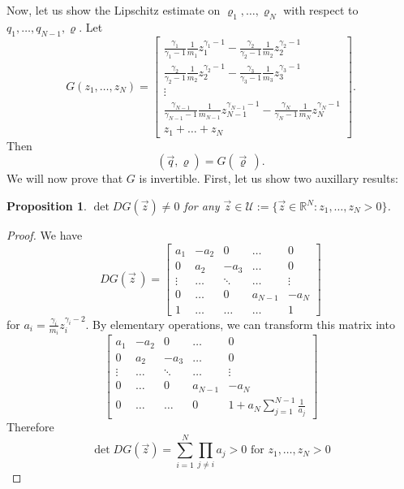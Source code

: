 \documentclass[11pt]{article}
\newtheorem{prop}[tw]{Proposition}
\numberwithin{equation}{section}
\numberwithin{tw}{section}
\begin{document}
Now, let us show the Lipschitz estimate on $\varrho_1,\dots,\varrho_N$ with respect to $q_1,\dots,q_{N-1},\varrho$. Let 
\[ G(z_1,\dots,z_N) = \left[\begin{gathered}
\frac{\gamma_1}{\gamma_1-1}\frac{1}{m_1}z_1^{\gamma_1-1} - \frac{\gamma_2}{\gamma_2-1}\frac{1}{m_2}z_2^{\gamma_2-1} \\
\frac{\gamma_2}{\gamma_2-1}\frac{1}{m_2}z_2^{\gamma_2-1} - \frac{\gamma_3}{\gamma_3-1}\frac{1}{m_3}z_3^{\gamma_3-1} \\
\vdots \\
\frac{\gamma_{N-1}}{\gamma_{N-1}-1}\frac{1}{m_{N-1}}z_{N-1}^{\gamma_{N-1}-1} - \frac{\gamma_N}{\gamma_N-1}\frac{1}{m_N}z_N^{\gamma_N-1} \\
z_1 + \dots + z_N
\end{gathered}\right]. \]
Then
\[ (\vec q, \varrho) = G(\vec\varrho\,). \]
We will now prove that $G$ is invertible. First, let us show two auxillary results:

\begin{prop}\label{det}
    $\det DG(\vec z)\neq 0$ for any $\vec z \in \mathcal{U} :=\{\vec z\in\mathbb{R}^N: z_1,\dots,z_N > 0\}$.
\end{prop}
\begin{proof}
    We have
    \[ DG(\vec z\,) = \begin{bmatrix}
        a_1 & -a_2 & 0 & \dots & 0 \\
        0 & a_2 & -a_3 & \dots & 0 \\
        \vdots & \dots & \ddots & \dots & \vdots \\
        0 & \dots & 0 & a_{N-1} & -a_N \\
        1 & \dots & \dots & \dots & 1
    \end{bmatrix}\]
    for $a_i = \frac{\gamma_i}{m_i}z_i^{\gamma_i-2}$. By elementary operations, we can transform this matrix into
    \[\begin{bmatrix}
        a_1 & -a_2 & 0 & \dots & 0 \\
        0 & a_2 & -a_3 & \dots & 0 \\
        \vdots & \dots & \ddots & \dots & \vdots \\
        0 & \dots & 0 & a_{N-1} & -a_N \\
        0 & \dots & \dots & 0 & 1+a_N\sum_{j=1}^{N-1}\frac{1}{a_j}
    \end{bmatrix}\]
    Therefore 
    \[ \det DG(\vec z) = \sum_{i=1}^N\prod_{j\neq i}a_j >0 
    \text{ \ \ \ \ \ \ for \ \ $z_1,\dots,z_N>0$} \]
\end{proof}
\end{document}
